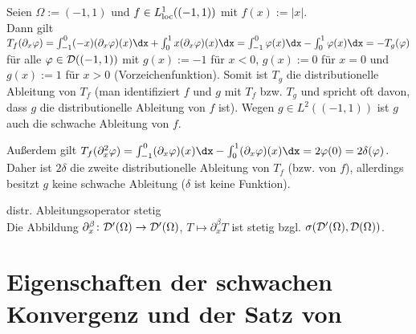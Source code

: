 \begin{Bsp}
    Seien $\Omega := (-1, 1)$ und $f \in L^1_{\text{loc}}((-1, 1))$ mit $f(x) := |x|$.\\
    Dann gilt $T_f(\partial_x \varphi) = \int_{-1}^0 (-x)(\partial_x \varphi)(x) \dx +
    \int_0^1 x (\partial_x \varphi)(x) \dx = \int_{-1}^0 \varphi(x) \dx - \int_0^1 \varphi(x)\dx
    = -T_g(\varphi)$ für alle $\varphi \in \mathcal{D}((-1, 1))$ mit
    $g(x) := -1$ für $x < 0$, $g(x) := 0$ für $x = 0$ und $g(x) := 1$ für $x > 0$
    (Vorzeichenfunktion).
    Somit ist $T_g$ die distributionelle Ableitung von $T_f$
    (man identifiziert $f$ und $g$ mit $T_f$ bzw. $T_g$ und spricht oft davon,
    dass $g$ die distributionelle Ableitung von $f$ ist).
    Wegen $g \in L^2((-1, 1))$ ist $g$ auch die schwache Ableitung von $f$.

    Außerdem gilt
    $T_f(\partial_x^2 \varphi) =
    \int_{-1}^0 (\partial_x \varphi)(x)\dx - \int_0^1 (\partial_x \varphi)(x) \dx =
    2\varphi(0) = 2\delta(\varphi)$.
    Daher ist $2\delta$ die zweite distributionelle Ableitung von $T_f$ (bzw. von $f$),
    allerdings besitzt $g$ keine schwache Ableitung ($\delta$ ist keine Funktion).
\end{Bsp}

\begin{Satz}{distr. Ableitungsoperator stetig}\\
    Die Abbildung $\partial^\beta_x\colon \mathcal{D}'(\Omega) \rightarrow \mathcal{D}'(\Omega)$,
    $T \mapsto \partial^\beta_x T$ ist stetig bzgl. $\sigma(\mathcal{D}'(\Omega), \mathcal{D}(\Omega))$.
\end{Satz}

\pagebreak

\section{%
    Eigenschaften der schwachen Konvergenz und der Satz von %
}

